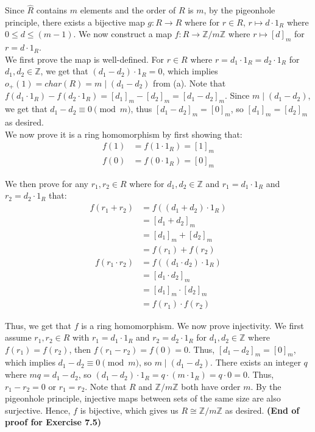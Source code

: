 \documentclass{article}
\begin{document}
\begin{enumerate}
\begin{enumerate}
    Since $\hat{R}$ contains $m$ elements and the order of $R$ is $m$, by the pigeonhole principle, there exists a bijective map $g : R \rightarrow R$ where for $r \in R$, $r \mapsto d\cdot 1_R$ where $0 \leq d \leq (m - 1)$. We now construct a map $f: R \rightarrow \mathbb{Z} / m \mathbb{Z}$ where $r \mapsto [d]_m$ for $r = d \cdot 1_R$. \\
    
    We first prove the map is well-defined. For $r \in R$ where $r = d_1 \cdot 1_R = d_2 \cdot 1_R$ for $d_1, d_2 \in \mathbb{Z}$, we get that $(d_1 - d_2)\cdot 1_R = 0$, which implies $o_+(1) = char(R) = m \mid (d_1 - d_2)$ from (a). Note that $f(d_1 \cdot 1_R) - f(d_2 \cdot 1_R)= [d_1]_m - [d_2]_m = [d_1 - d_2]_m$. Since $m \mid (d_1 - d_2)$, we get that $d_1 - d_2 \equiv 0 \pmod m$, thus $[d_1 - d_2]_m = [0]_m$, so $[d_1]_m = [d_2]_m$ as desired. \\
        
    We now prove it is a ring homomorphism by first showing that:
    \begin{align*}
        f(1) &= f(1 \cdot 1_R) = [1]_m \\
        f(0) &= f(0 \cdot 1_R) = [0]_m
    \end{align*}
    
    We then prove for any $r_1, r_2 \in R$ where for $d_1, d_2 \in \mathbb{Z}$ and $r_1 = d_1 \cdot 1_R$ and $r_2 = d_2 \cdot 1_R$ that: 
    \begin{align*}
        f(r_1 + r_2) &= f((d_1 + d_2) \cdot 1_R) \\
        &= [d_1 + d_2]_m \\
        &= [d_1]_m + [d_2]_m \\
        &= f(r_1) + f(r_2)
    \end{align*}
    \begin{align*}
        f(r_1 \cdot r_2) &= f((d_1 \cdot d_2) \cdot 1_R) \\
        &= [d_1 \cdot d_2]_m \\
        &= [d_1]_m \cdot [d_2]_m \\
        &= f(r_1) \cdot f(r_2)
    \end{align*}
    
    Thus, we get that $f$ is a ring homomorphism. We now prove injectivity. We first assume $r_1, r_2 \in R$ with $r_1 = d_1 \cdot 1_R$ and $r_2 = d_2 \cdot 1_R$ for $d_1, d_2 \in \mathbb{Z}$ where $f(r_1) = f(r_2)$, then $f(r_1 - r_2) = f(0) = 0$. Thus, $[d_1 - d_2]_m = [0]_m$, which implies $d_1 - d_2 \equiv 0 \pmod m$, so $m \mid (d_1 - d_2)$. There exists an integer $q$ where $mq = d_1 - d_2$, so $(d_1 - d_2) \cdot 1_R = q \cdot (m \cdot 1_R) = q \cdot 0 = 0$. Thus, $r_1 - r_2 = 0$ or $r_1 = r_2$. Note that $R$ and $\mathbb{Z} / m \mathbb{Z}$ both have order $m$. By the pigeonhole principle, injective maps between sets of the same size are also surjective. Hence, $f$ is bijective, which gives us $R \cong \mathbb{Z} / m \mathbb{Z}$ as desired. \textbf{(End of proof for Exercise 7.5)}\\


\end{enumerate}
\end{enumerate}
\end{document}
